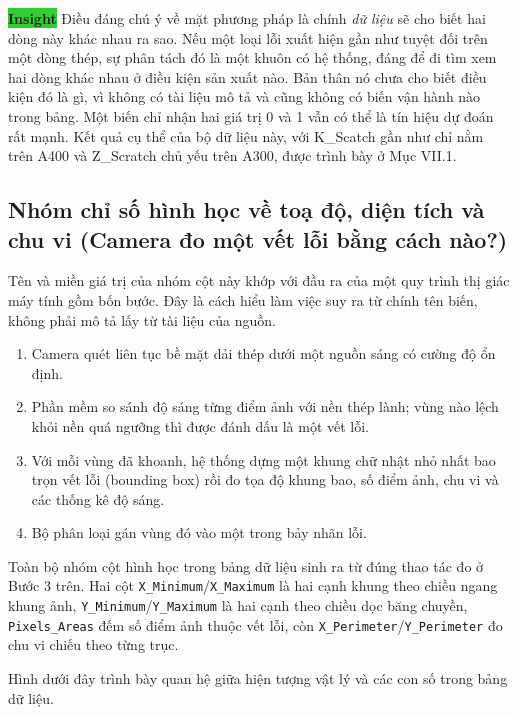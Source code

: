 \documentclass[12pt]{article}
\begin{document}
\noindent \colorbox{LimeGreen}{\textbf{Insight}} Điều đáng chú ý về mặt phương pháp là chính \emph{dữ liệu} sẽ cho biết hai dòng này khác nhau ra sao. Nếu một loại lỗi xuất hiện gần như tuyệt đối trên một dòng thép, sự phân tách đó là một khuôn có hệ thống, đáng để đi tìm xem hai dòng khác nhau ở điều kiện sản xuất nào. Bản thân nó chưa cho biết điều kiện đó là gì, vì không có tài liệu mô tả và cũng không có biến vận hành nào trong bảng. Một biến chỉ nhận hai giá trị 0 và 1 vẫn có thể là tín hiệu dự đoán rất mạnh. Kết quả cụ thể của bộ dữ liệu này, với K\_Scatch gần như chỉ nằm trên A400 và Z\_Scratch chủ yếu trên A300, được trình bày ở Mục VII.1.

\subsection{Nhóm chỉ số hình học về toạ độ, diện tích và chu vi (Camera đo một vết lỗi bằng cách nào?)}

Tên và miền giá trị của nhóm cột này khớp với đầu ra của một quy trình thị giác máy tính gồm bốn bước. Đây là cách hiểu làm việc suy ra từ chính tên biến, không phải mô tả lấy từ tài liệu của nguồn.

\begin{enumerate}
  \item Camera quét liên tục bề mặt dải thép dưới một nguồn sáng có cường độ ổn định.
  \item Phần mềm so sánh độ sáng từng điểm ảnh với nền thép lành; vùng nào lệch khỏi nền quá ngưỡng thì được đánh dấu là một vết lỗi.
  \item Với mỗi vùng đã khoanh, hệ thống dựng một khung chữ nhật nhỏ nhất bao trọn vết lỗi (bounding box) rồi đo tọa độ khung bao, số điểm ảnh, chu vi và các thống kê độ sáng.
  \item Bộ phân loại gán vùng đó vào một trong bảy nhãn lỗi.
\end{enumerate}

\noindent Toàn bộ nhóm cột hình học trong bảng dữ liệu sinh ra từ đúng thao tác đo ở Bước 3 trên. Hai cột \texttt{X\_Minimum}/\texttt{X\_Maximum} là hai cạnh khung theo chiều ngang khung ảnh, \texttt{Y\_Minimum}/\texttt{Y\_Maximum} là hai cạnh theo chiều dọc băng chuyền, \texttt{Pixels\_Areas} đếm số điểm ảnh thuộc vết lỗi, còn \texttt{X\_Perimeter}/\texttt{Y\_Perimeter} đo chu vi chiếu theo từng trục.

\noindent Hình dưới đây trình bày quan hệ giữa hiện tượng vật lý và các con số trong bảng dữ liệu.
\end{document}
